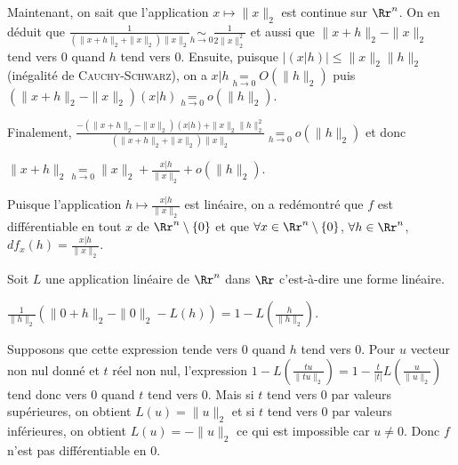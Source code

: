 {{Maintenant, on sait que l'application $x\mapsto\|x\|_2$ est continue sur $\Rr^n$. On en déduit que $ \frac{1}{\left(\|x+h\|_2+\|x\|_2\right)\|x\|_2}\underset{h\rightarrow0}{\sim} \frac{1}{2\|x\|_2^2}$ et aussi que $\|x+h\|_2-\|x\|_2$ tend vers $0$ quand $h$ tend vers $0$. Ensuite, puisque $\left|(x|h)\right|\leqslant\|x\|_2\|h\|_2$ (inégalité de \textsc{Cauchy}-\textsc{Schwarz}), on a $x|h\underset{h\rightarrow0}{=}O(\|h\|_2)$ puis $\left(\|x+h\|_2-\|x\|_2\right)\left(x|h\right)\underset{h\rightarrow0}{=}o(\|h\|_2)$.

Finalement, $ \frac{-\left(\|x+h\|_2-\|x\|_2\right)(x|h)+\|x\|_2\|h\|_2^2}{\left(\|x+h\|_2+\|x\|_2\right)\|x\|_2}\underset{h\rightarrow0}{=}o(\|h\|_2)$ et donc

\begin{center}
$\|x+h\|_2\underset{h\rightarrow0}{=}\|x\|_2+ \frac{x|h}{\|x\|_2}+o(\|h\|_2)$.
\end{center}

Puisque l'application $h\mapsto \frac{x|h}{\|x\|_2}$ est linéaire, on a redémontré que $f$ est différentiable en tout $x$ de $\Rr^n\setminus\{0\}$ et que $\forall x\in\Rr^n\setminus\{0\}$, $\forall h\in\Rr^n$, $df_x(h)= \frac{x|h}{\|x\|_2}$.

Soit $L$ une application linéaire de $\Rr^n$ dans $\Rr$ c'est-à-dire une forme linéaire.

\begin{center}
$ \frac{1}{\|h\|_2}\left(\|0+h\|_2-\|0\|_2-L(h)\right)=1-L\left( \frac{h}{\|h\|_2}\right)$.
\end{center}

Supposons que cette expression tende vers $0$ quand $h$ tend vers $0$. Pour $u$ vecteur non nul donné et $t$ réel non nul, l'expression $1-L\left( \frac{tu}{\|tu\|_2}\right)=1- \frac{t}{|t|}L\left( \frac{u}{\|u\|_2}\right)$ tend donc vers $0$ quand $t$ tend vers $0$. Mais si $t$ tend vers $0$ par valeurs supérieures, on obtient $L(u)=\|u\|_2$ et si $t$ tend vers $0$ par valeurs inférieures, on obtient $L(u)=-\|u\|_2$ ce qui est impossible car $u\neq0$. Donc $f$ n'est pas différentiable en $0$.
}
}
